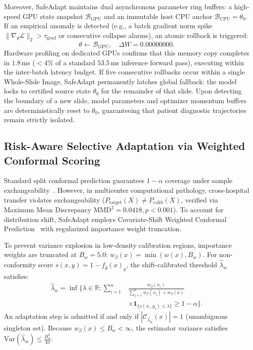 \documentclass[journal]{IEEEtran}
\begin{document}
Moreover, SafeAdapt maintains dual asynchronous parameter ring buffers: a high-speed GPU state snapshot $\mathcal{B}_{\text{GPU}}$ and an immutable host CPU anchor $\mathcal{B}_{\text{CPU}} = \theta_0$. If an empirical anomaly is detected (e.g., a batch gradient norm spike $\|\nabla_\theta \mathcal{L}\|_2 > \tau_{\text{grad}}$ or consecutive collapse alarms), an atomic rollback is triggered:
\begin{equation}
\label{eq:rollback_op}
\theta \leftarrow \mathcal{B}_{\text{GPU}}, \quad \Delta W = 0.00000000.
\end{equation}
Hardware profiling on dedicated GPUs confirms that this memory copy completes in $1.8$\,ms ($<4\%$ of a standard $53.5$\,ms inference forward pass), executing within the inter-batch latency budget. If five consecutive rollbacks occur within a single Whole-Slide Image, SafeAdapt permanently latches global fallback: the model locks to certified source state $\theta_0$ for the remainder of that slide. Upon detecting the boundary of a new slide, model parameters and optimizer momentum buffers are deterministically reset to $\theta_0$, guaranteeing that patient diagnostic trajectories remain strictly isolated.

\subsection{Risk-Aware Selective Adaptation via Weighted Conformal Scoring}
\label{sec:conformal_risk}
Standard split conformal prediction guarantees $1-\alpha$ coverage under sample exchangeability~\cite{bates2023conformal}. However, in multicenter computational pathology, cross-hospital transfer violates exchangeability ($P_{\mathrm{target}}(X) \ne P_{\mathrm{calib}}(X)$, verified via Maximum Mean Discrepancy $\mathrm{MMD}^2 = 0.0418, p < 0.001$). To account for distribution shift, SafeAdapt employs Covariate-Shift Weighted Conformal Prediction~\cite{tibshirani2019conformal} with regularized importance weight truncation.

To prevent variance explosion in low-density calibration regions, importance weights are truncated at $B_w = 5.0$: $w_\beta(x) = \min(w(x), B_w)$. For non-conformity score $s(x, y) = 1 - f_{\hat{\theta}}(x)_y$, the shift-calibrated threshold $\hat{\lambda}_w$ satisfies:
\begin{equation}
\label{eq:weighted_conformal}
\begin{aligned}
\hat{\lambda}_w = \inf \Biggl\{ \lambda \in \mathbb{R} : \sum_{i=1}^n &\frac{w_\beta(x_i)}{\sum_{j=1}^n w_\beta(x_j) + w_\beta(x)} \\
&\times \mathbf{1}_{\{s(x_i, y_i) \le \lambda\}} \ge 1 - \alpha \Biggr\}.
\end{aligned}
\end{equation}
An adaptation step is admitted if and only if $|\mathcal{C}_{\hat{\lambda}_w}(x)| = 1$ (unambiguous singleton set). Because $w_\beta(x) \le B_w < \infty$, the estimator variance satisfies $\mathrm{Var}(\hat{\lambda}_w) \le \frac{B_w^2}{4n}$.
\end{document}

